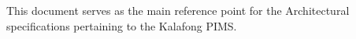 This document serves as the main reference point for the Architectural specifications pertaining to the Kalafong PIMS.